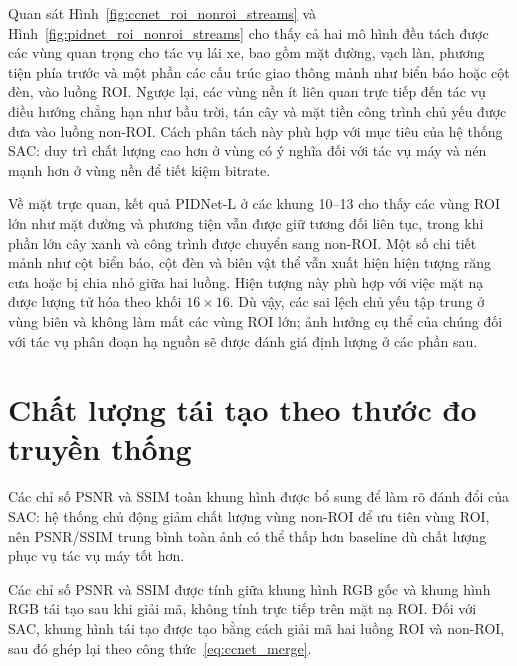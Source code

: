 Quan sát Hình~\ref{fig:ccnet_roi_nonroi_streams} và Hình~\ref{fig:pidnet_roi_nonroi_streams} cho thấy cả hai mô hình đều tách được các vùng quan trọng cho tác vụ lái xe, bao gồm mặt đường, vạch làn, phương tiện phía trước và một phần các cấu trúc giao thông mảnh như biển báo hoặc cột đèn, vào luồng ROI. Ngược lại, các vùng nền ít liên quan trực tiếp đến tác vụ điều hướng chẳng hạn như bầu trời, tán cây và mặt tiền công trình chủ yếu được đưa vào luồng non-ROI. Cách phân tách này phù hợp với mục tiêu của hệ thống SAC: duy trì chất lượng cao hơn ở vùng có ý nghĩa đối với tác vụ máy và nén mạnh hơn ở vùng nền để tiết kiệm bitrate.

Về mặt trực quan, kết quả PIDNet-L ở các khung 10--13 cho thấy các vùng ROI lớn như mặt đường và phương tiện vẫn được giữ tương đối liên tục, trong khi phần lớn cây xanh và công trình được chuyển sang non-ROI. Một số chi tiết mảnh như cột biển báo, cột đèn và biên vật thể vẫn xuất hiện hiện tượng răng cưa hoặc bị chia nhỏ giữa hai luồng. Hiện tượng này phù hợp với việc mặt nạ được lượng tử hóa theo khối $16\times16$. Dù vậy, các sai lệch chủ yếu tập trung ở vùng biên và không làm mất các vùng ROI lớn; ảnh hưởng cụ thể của chúng đối với tác vụ phân đoạn hạ nguồn sẽ được đánh giá định lượng ở các phần sau.

\section{Chất lượng tái tạo theo thước đo truyền thống}
\label{sec:traditional-quality}

Các chỉ số PSNR và SSIM toàn khung hình được bổ sung để làm rõ đánh đổi của SAC: hệ thống chủ động giảm chất lượng vùng non-ROI để ưu tiên vùng ROI, nên PSNR/SSIM trung bình toàn ảnh có thể thấp hơn baseline dù chất lượng phục vụ tác vụ máy tốt hơn.

Các chỉ số PSNR và SSIM được tính giữa khung hình RGB gốc và khung hình RGB tái tạo sau khi giải mã, không tính trực tiếp trên mặt nạ ROI. Đối với SAC, khung hình tái tạo được tạo bằng cách giải mã hai luồng ROI và non-ROI, sau đó ghép lại theo công thức~\eqref{eq:ccnet_merge}.

